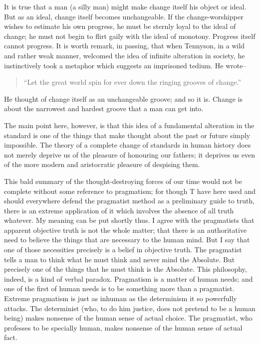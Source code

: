 \documentclass{book}
\newenvironment{mdblockquote}{%
  \begin{quotation}
    \itshape
}{%
  \end{quotation}
}
\begin{document}
It is true that a man (a silly man) might make change itself his object or ideal. But as an ideal, change itself becomes unchangeable. If the change-worshipper wishes to estimate his own progress, he must be sternly loyal to the ideal of change; he must not begin to flirt gaily with the ideal of monotony. Progress itself cannot progress. It is worth remark, in passing, that when Tennyson, in a wild and rather weak manner, welcomed the idea of infinite alteration in society, he instinctively took a metaphor which suggests an imprisoned tedium. He wrote–

\begin{mdblockquote}
“Let the great world spin for ever down the ringing grooves of change.”


\end{mdblockquote}
He thought of change itself as an unchangeable groove; and so it is. Change is about the narrowest and hardest groove that a man can get into.

The main point here, however, is that this idea of a fundamental alteration in the standard is one of the things that make thought about the past or future simply impossible. The theory of a complete change of standards in human history does not merely deprive us of the pleasure of honouring our fathers; it deprives us even of the more modern and aristocratic pleasure of despising them.

This bald summary of the thought-destroying forces of our time would not be complete without some reference to pragmatism; for though T have here used and should everywhere defend the pragmatist method as a preliminary guide to truth, there is an extreme application of it which involves the absence of all truth whatever. My meaning can be put shortly thus. I agree with the pragmatists that apparent objective truth is not the whole matter; that there is an authoritative need to believe the things that are necessary to the human mind. But I say that one of those necessities precisely is a belief in objective truth. The pragmatist tells a man to think what he must think and never mind the Absolute. But precisely one of the things that he must think is the Absolute. This philosophy, indeed, is a kind of verbal paradox. Pragmatism is a matter of human needs; and one of the first of human needs is to be something more than a pragmatist. Extreme pragmatism is just as inhuman as the determinism it so powerfully attacks. The determinist (who, to do him justice, does not pretend to be a human being) makes nonsense of the human sense of actual choice. The pragmatist, who professes to be specially human, makes nonsense of the human sense of actual fact.
\end{document}
